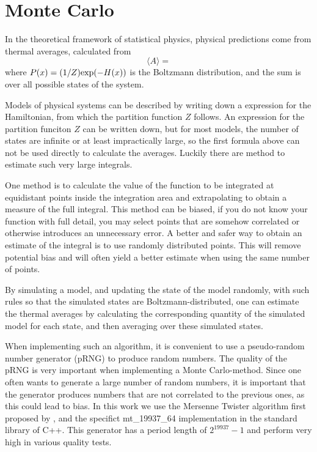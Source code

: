 %

\section{Monte Carlo}
In the theoretical framework of statistical physics, physical predictions come from thermal averages, calculated from 
\begin{equation}
  \langle A \rangle = 
  \label{}
\end{equation}
where  $P(x) = (1/Z)\textrm{exp}(-H(x))$ is the Boltzmann distribution, and the sum is over all possible states of the system. 

Models of physical systems can be described by writing down a expression for the Hamiltonian, from which the partition function $Z$ follows.
An expression for the partition funciton $Z$ can be written down, but for most models, the number of states are infinite or at least impractically large, so the first formula above can not be used directly to calculate the averages.
Luckily there are method to estimate such very large integrals.

One method is to calculate the value of the function to be integrated at equidistant points inside the integration area and extrapolating to obtain a measure of the full integral.
This method can be biased, if you do not know your function with full detail, you may select points that are somehow correlated or otherwise introduces an unnecessary error.
A better and safer way to obtain an estimate of the integral is to use randomly distributed points.
This will remove potential bias and will often yield a better estimate when using the same number of points.

By simulating a model, and updating the state of the model randomly, with such rules so that the simulated states are Boltzmann-distributed, one can estimate the thermal averages by calculating the corresponding quantity of the simulated model for each state, and then averaging over these simulated states. 

When implementing such an algorithm, it is convenient to use a pseudo-random number generator (pRNG) to produce random numbers.
The quality of the pRNG is very important when implementing a Monte Carlo-method.
Since one often wants to generate a large number of random numbers, it is important that the generator produces numbers that are not correlated to the previous ones, as this could lead to bias. 
In this work we use the Mersenne Twister algorithm first proposed by \cite{Matsumoto1998}, and the specifict  mt\_19937\_64  implementation in the standard library of C++.
This generator has a period length of $2^{19937}-1$ and perform very high in various quality tests.


